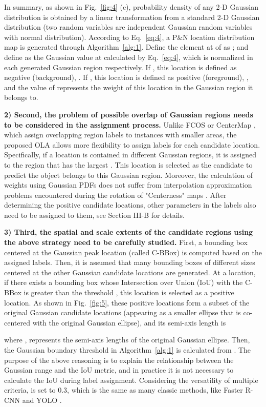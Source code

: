 In summary, as shown in Fig.~\ref{fig:4} (c), probability density of any 2-D Gaussian distribution  is obtained by a linear transformation from a standard 2-D Gaussian distribution (two random variables are independent Gaussian random variables with normal distribution). According to Eq.~\ref{eq:4}, a P\&N location distribution map  is generated through Algorithm~\ref{alg:1}. Define the element at  of  as ; and define  as the Gaussian value at  calculated by Eq.~\ref{eq:4}, which is normalized in each generated Gaussian region respectively. If , this location is defined as negative (background), . If , this location is defined as positive (foreground), , and the value of  represents the weight of this location in the Gaussian region it belongs to. 

\textbf{2) Second, the problem of possible overlap of Gaussian regions needs to be considered in the assignment process.} Unlike FCOS \cite{tian2019fcos} or CenterMap \cite{wang2020learning}, which assign overlapping region labels to instances with smaller areas, the proposed OLA allows more flexibility to assign labels for each candidate location. Specifically, if a location is contained in different Gaussian regions, it is assigned to the region that has the largest . This location is selected as the candidate to predict the object belongs to this Gaussian region. Moreover, the calculation of weights using Gaussian PDFs does not suffer from interpolation approximation problems encountered during the rotation of "Centerness" maps \cite{wang2020learning}. After determining the positive candidate locations, other parameters in the labels also need to be assigned to them, see Section III-B for details. 

\textbf{3) Third, the spatial and scale extents of the candidate regions using the above strategy need to be carefully studied.} First, a bounding box centered at the Gaussian peak location (called C-BBox) is computed based on the assigned labels. Then, it is assumed that many bounding boxes of different sizes centered at the other Gaussian candidate locations are generated. At a location, if there exists a bounding box whose Intersection over Union (IoU) with the C-BBox is greater than the threshold , this location is selected as a positive location. As shown in Fig.~\ref{fig:5}, these positive locations form a subset of the original Gaussian candidate locations (appearing as a smaller ellipse that is co-centered with the original Gaussian ellipse), and its semi-axis length is

where , represents the semi-axis lengths of the original Gaussian ellipse. Then, the Gaussian boundary threshold in Algorithm~\ref{alg:1} is calculated from . The purpose of the above reasoning is to explain the relationship between the Gaussian range and the IoU metric, and in practice it is not necessary to calculate the IoU during label assignment. Considering the versatility of multiple criteria,  is set to 0.3, which is the same as many classic methods, like Faster R-CNN \cite{renFasterRCNNRealTime2017a} and YOLO \cite{redmonYOLOv3IncrementalImprovement2018}. 

